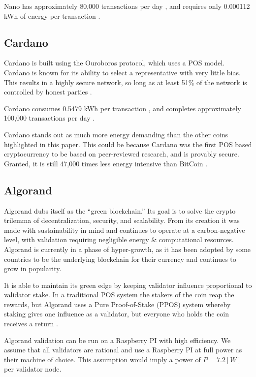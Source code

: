 \documentclass{article}
\begin{document}
Nano has approximately 80,000 transactions per day \cite{nanolooker}, and requires only 0.000112 kWh of energy per transaction \cite{realsimple}.

\subsection{Cardano}

Cardano is built using the Ouroboros protocol, which uses a POS model. Cardano is known for its ability to select a representative with very little bias. This results in a highly secure network, so long as at least 51\% of the network is controlled by honest parties \cite{ouroboros}.

Cardano consumes 0.5479 kWh per transaction \cite{cryptovantage}, and completes approximately 100,000 transactions per day \cite{cardanodatastudio}.

Cardano stands out as much more energy demanding than the other coins highlighted in this paper. This could be because Cardano was the first POS based cryptocurrency to be based on peer-reviewed research, and is provably secure. Granted, it is still 47,000 times less energy intensive than BitCoin \cite{cardanodatastudio}.

\subsection{Algorand}

Algorand dubs itself as the “green blockchain.” Its goal is to solve the crypto trilemma of decentralization, security, and scalability.  From its creation it was made with sustainability in mind and continues to operate at a carbon-negative level, with validation requiring negligible energy \& computational resources. Algorand is currently in a phase of hyper-growth, as it has been adopted by some countries to be the underlying blockchain for their currency and continues to grow in popularity. 

It is able to maintain its green edge by keeping validator influence proportional to validator stake. In a traditional POS system the stakers of the coin reap the rewards, but Algorand uses a Pure Proof-of-Stake (PPOS) system whereby staking gives one influence as a validator, but everyone who holds the coin receives a return \cite{algoppos}.

Algorand validation can be run on a Raspberry PI with high efficiency. We assume that all validators are rational and use a Raspberry PI at full power as their machine of choice. This assumption would imply a power of $P = 7.2[W]$ per validator node. 
\end{document}
